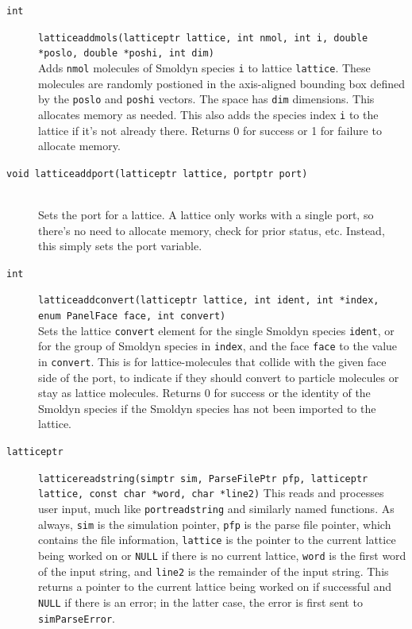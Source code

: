 \documentclass {scrbook}
\newcommand {\ttt} {\texttt}
\begin{document}
\begin{description}
\item[\ttt{int}]
\ttt{latticeaddmols(latticeptr lattice, int nmol, int i, double *poslo, double *poshi, int dim)}
\hfill \\
Adds \ttt{nmol} molecules of Smoldyn species \ttt{i} to lattice \ttt{lattice}. These molecules are randomly postioned in the axis-aligned bounding box defined by the \ttt{poslo} and \ttt{poshi} vectors. The space has \ttt{dim} dimensions. This allocates memory as needed. This also adds the species index \ttt{i} to the lattice if it's not already there. Returns 0 for success or 1 for failure to allocate memory.

\item[\ttt{void latticeaddport(latticeptr lattice, portptr port)}]
\hfill \\
Sets the port for a lattice. A lattice only works with a single port, so there's no need to allocate memory, check for prior status, etc. Instead, this simply sets the port variable.

\item[\ttt{int}]
\ttt{latticeaddconvert(latticeptr lattice, int ident, int *index, enum PanelFace face, int convert)}
\hfill \\
Sets the lattice \ttt{convert} element for the single Smoldyn species \ttt{ident}, or for the group of Smoldyn species in \ttt{index}, and the face \ttt{face} to the value in \ttt{convert}. This is for lattice-molecules that collide with the given face side of the port, to indicate if they should convert to particle molecules or stay as lattice molecules. Returns 0 for success or the identity of the Smoldyn species if the Smoldyn species has not been imported to the lattice.

\item[\ttt{latticeptr}]
\ttt{latticereadstring(simptr sim, ParseFilePtr pfp, latticeptr lattice, const char *word, char *line2)}
This reads and processes user input, much like \ttt{portreadstring} and similarly named functions. As always, \ttt{sim} is the simulation pointer, \ttt{pfp} is the parse file pointer, which contains the file information, \ttt{lattice} is the pointer to the current lattice being worked on or \ttt{NULL} if there is no current lattice, \ttt{word} is the first word of the input string, and \ttt{line2} is the remainder of the input string. This returns a pointer to the current lattice being worked on if successful and \ttt{NULL} if there is an error; in the latter case, the error is first sent to \ttt{simParseError}. 


\end{description}
\end{document}
